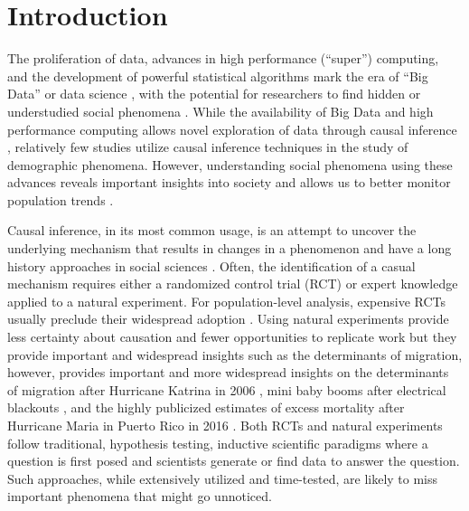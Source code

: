 \documentclass[12pt]{article}
\begin{document}
\newpage
{} %

\newpage

\hypertarget{introduction}{%
\section{Introduction}\label{introduction}}

The proliferation of data, advances in high performance (``super'')
computing, and the development of powerful statistical algorithms mark
the era of ``Big Data'' or data science
\citep{van2016data, zikopoulos2011}, with the potential for researchers
to find hidden or understudied social phenomena
\citep{bohon2018demography}. While the availability of Big Data and high
performance computing allows novel exploration of data through causal
inference
\citep{bohon2018demography, rcausalimpact, shiffrin2016drawing},
relatively few studies utilize causal inference techniques in the study
of demographic phenomena. However, understanding social phenomena using
these advances reveals important insights into society
\citep{angrist1989lifetime, mas2009peers} and allows us to better
monitor population trends \citep{nobles2019, torche2015hidden}.

Causal inference, in its most common usage, is an attempt to uncover the
underlying mechanism that results in changes in a phenomenon and have a
long history approaches in social sciences \citep{grimmer2015ppsp}.
Often, the identification of a casual mechanism requires either a
randomized control trial (RCT) or expert knowledge applied to a natural
experiment. For population-level analysis, expensive RCTs usually
preclude their widespread adoption \citep{west2008ajph}. Using natural
experiments provide less certainty about causation and fewer
opportunities to replicate work but they provide important and
widespread insights such as the determinants of migration, however,
provides important and more widespread insights on the determinants of
migration after Hurricane Katrina in 2006
\citep{fussellRecoveryMigrationCity2014, horiDisplacementDynamicsSouthern2009},
mini baby booms after electrical blackouts \citep{fetzer2018jpe}, and
the highly publicized estimates of excess mortality after Hurricane
Maria in Puerto Rico in 2016
\citep{kishore2018mortality, santos2018use}. Both RCTs and natural
experiments follow traditional, hypothesis testing, inductive scientific
paradigms where a question is first posed and scientists generate or
find data to answer the question. Such approaches, while extensively
utilized and time-tested, are likely to miss important phenomena that
might go unnoticed.
\end{document}
